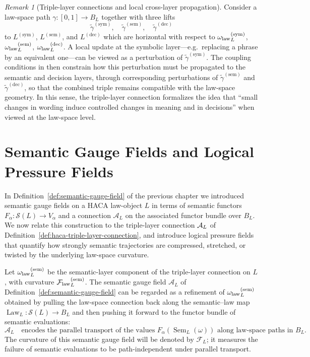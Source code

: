\documentclass[11pt]{book}
\theoremstyle{plain}
\theoremstyle{definition}
\theoremstyle{remark}
\newtheorem{remark}[theorem]{Remark}
\begin{document}
\begin{remark}[Triple-layer connections and local cross-layer propagation]
\label{rem:haca-triple-layer-propagation}
Consider a law-space path $\gamma:[0,1]\to B_L$ together with three
lifts
\[
  \tilde{\gamma}^{(\mathrm{sym})},
  \quad
  \tilde{\gamma}^{(\mathrm{sem})},
  \quad
  \tilde{\gamma}^{(\mathrm{dec})}
\]
to $L^{(\mathrm{sym})}$, $L^{(\mathrm{sem})}$, and $L^{(\mathrm{dec})}$
which are horizontal with respect to
${\omega_{\mathrm{law}}}_L^{(\mathrm{sym})}$,
${\omega_{\mathrm{law}}}_L^{(\mathrm{sem})}$,
${\omega_{\mathrm{law}}}_L^{(\mathrm{dec})}$.
A local update at the symbolic layer—e.g.\ replacing a phrase by an
equivalent one—can be viewed as a perturbation of
$\tilde{\gamma}^{(\mathrm{sym})}$. The coupling conditions in \GZTLC
then constrain how this perturbation must be propagated to the semantic
and decision layers, through corresponding perturbations of
$\tilde{\gamma}^{(\mathrm{sem})}$ and $\tilde{\gamma}^{(\mathrm{dec})}$,
so that the combined triple remains compatible with the law-space
geometry. In this sense, the triple-layer connection formalizes the
idea that ``small changes in wording induce controlled changes in
meaning and in decisions'' when viewed at the law-space level.
\end{remark}

\section[Semantic Gauge Fields and Logical Pressure Fields]{Semantic Gauge Fields and Logical Pressure Fields}


In Definition~\ref{def:semantic-gauge-field} of the previous chapter we
introduced semantic gauge fields on a HACA law-object $L$ in terms of
semantic functors $F_\alpha:\mathcal{S}(L)\to V_\alpha$ and a connection
$\mathcal{A}_L$ on the associated functor bundle over $B_L$. We now
relate this construction to the triple-layer connection
$\mathcal{A}_L$ of Definition~\ref{def:haca-triple-layer-connection}, and
introduce logical pressure fields that quantify how strongly semantic
trajectories are compressed, stretched, or twisted by the underlying
law-space curvature.

Let ${\omega_{\mathrm{law}}}_L^{(\mathrm{sem})}$ be the semantic-layer component of the
triple-layer connection on $L$, with curvature
${\mathcal{F}_{\mathrm{law}}}_L^{(\mathrm{sem})}$. The semantic gauge field
$\mathcal{A}_L$ of Definition~\ref{def:semantic-gauge-field} can be
regarded as a refinement of ${\omega_{\mathrm{law}}}_L^{(\mathrm{sem})}$ obtained by
pulling the law-space connection back along the semantic--law map
$\operatorname{Law}_L:\mathcal{S}(L)\to B_L$ and then pushing it
forward to the functor bundle of semantic evaluations:
\[
  \mathcal{A}_L
  \quad\text{encodes the parallel transport of the values }
  F_\alpha(\operatorname{Sem}_L(\omega))
  \text{ along law-space paths in }B_L.
\]
The curvature of this semantic gauge field will be denoted by
$\mathcal{F}_L$; it measures the failure of semantic evaluations to be
path-independent under parallel transport.
\end{document}
